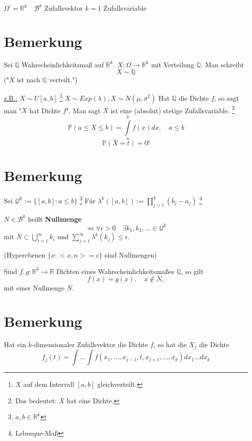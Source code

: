 \documentclass[a4paper,11pt,notitlepage]{report}
\newcommand{\R}{{\ensuremath{\mathbb{R}}}}
\newcommand{\Q}{{\ensuremath{\mathbb{Q}}}}
\newcommand{\Prim}{{\ensuremath{\mathbb{P}}}}
\begin{document}
$\Omega^\prime = \R^k \quad \mathcal{B}^k$ Zufallsvektor
\newline
$k=1$ Zufallsvariable

\section{Bemerkung}
Sei $\Q$ Wahrscheinlichkeitsmaß auf $\R^k$. \newline
$X \colon \Omega \rightarrow \R^k$ mit Verteilung $\Q$.
Man schreibt
$$X \sim \Q$$ ("$X$ ist nach $\Q$ verteilt.") \newline

\underline{z.B.:} $X \sim U[a,b]$ \footnote{$X$ auf dem Intervall $[a,b]$ gleichverteilt.} \newline
$X \sim Exp(\lambda), X \sim N(\mu, \sigma^2)$
\newline
Hat $\Q$ die Dichte $f$, so sagt man "$X$ hat Dichte $f$". \newline
Man sagt $X$ ist eine (absolut) stetige Zufallsvariable. \footnote{Das bedeutet: $X$ hat eine Dichte.}
\newline
$$\Prim(a \leq X \leq b) = \int\limits_a^b{f(x)dx}, \quad a \leq b$$
$$\Prim(X = t) = 0!$$

\section{Bemerkung}
Sei $\mathcal{Q}^k := \{ [a,b] \colon a \leq b \}$ \footnote{$a,b \in \R^k$} \newline
Für $\lambda^k([a,b]) := \prod\limits_{j=1}^k{(b_j - a_j)}$ \footnote{Lebesque-Maß}

$N \in \mathcal{B}^k$ heißt \textbf{Nullmenge}
$$\Leftrightarrow \forall \epsilon > 0 \quad \exists k_1, k_2, \ldots \in \mathcal{Q}^k$$
mit $N \subset \bigcup\limits_{i=1}^{\infty}{k_i}$ und $\sum\limits_{j=1}^{\infty}{\lambda^k(k_j)} \leq \epsilon$.

(Hyperebenen $\{ x \colon <x,n> = c \}$ sind Nullmengen) \newline

Sind $f,g \colon \R^k \rightarrow \R$ Dichten eines Wahrscheinlichkeitsmaßes $\Q$, so gilt
$$f(x) = g(x), \quad x \notin N,$$
mit einer Nullmenge $N$.

\section{Bemerkung}
Hat ein $k$-dimensionaler Zufallsvektor die Dichte $f$, so hat die
$X_j$ die Dichte
$$f_j(t)= \int \ldots \int f(x_1, \ldots, x_{j-1}, t, x_{j+1}, \ldots, x_k) dx_1 \ldots dx_k$$
\end{document}

